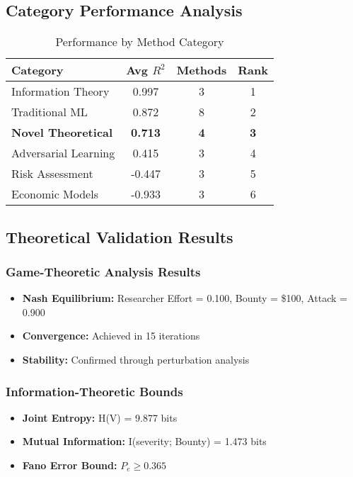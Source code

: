 \documentclass[journal]{IEEEtran}
\begin{document}
\subsection{Category Performance Analysis}

\begin{table}[htbp]
\centering
\caption{Performance by Method Category}
\label{tab:category}
\begin{tabular}{lccc}
\toprule
\textbf{Category} & \textbf{Avg $R^2$} & \textbf{Methods} & \textbf{Rank} \\
\midrule
Information Theory & 0.997 & 3 & 1 \\
Traditional ML & 0.872 & 8 & 2 \\
\textbf{Novel Theoretical} & \textbf{0.713} & \textbf{4} & \textbf{3} \\
Adversarial Learning & 0.415 & 3 & 4 \\
Risk Assessment & -0.447 & 3 & 5 \\
Economic Models & -0.933 & 3 & 6 \\
\bottomrule
\end{tabular}
\end{table}

\subsection{Theoretical Validation Results}

\subsubsection{Game-Theoretic Analysis Results}
\begin{itemize}
\item \textbf{Nash Equilibrium:} Researcher Effort = 0.100, Bounty = \$100, Attack = 0.900
\item \textbf{Convergence:} Achieved in 15 iterations
\item \textbf{Stability:} Confirmed through perturbation analysis
\end{itemize}

\subsubsection{Information-Theoretic Bounds}
\begin{itemize}
\item \textbf{Joint Entropy:} H(V) = 9.877 bits
\item \textbf{Mutual Information:} I(severity; Bounty) = 1.473 bits
\item \textbf{Fano Error Bound:} $P_e \geq 0.365$
\end{itemize}
\end{document}
